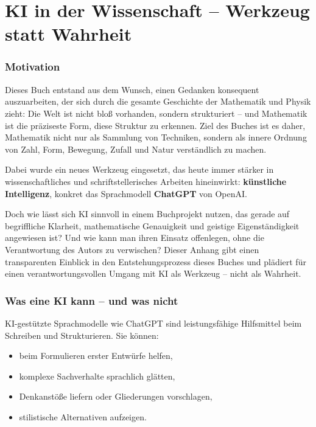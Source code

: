 \cleardoublepage

\chapter{KI in der Wissenschaft – Werkzeug statt Wahrheit}
\label{anhangC:ki}

\subsection*{Motivation}

Dieses Buch entstand aus dem Wunsch, einen Gedanken konsequent auszuarbeiten, der sich durch die gesamte Geschichte der Mathematik und Physik zieht: Die Welt ist nicht bloß vorhanden, sondern strukturiert -- und Mathematik ist die präziseste Form, diese Struktur zu erkennen. Ziel des Buches ist es daher, Mathematik nicht nur als Sammlung von Techniken, sondern als innere Ordnung von Zahl, Form, Bewegung, Zufall und Natur verständlich zu machen.

Dabei wurde ein neues Werkzeug eingesetzt, das heute immer stärker in wissenschaftliches und schriftstellerisches Arbeiten hineinwirkt: \textbf{künstliche Intelligenz}, konkret das Sprachmodell \textbf{ChatGPT} von OpenAI.

Doch wie lässt sich KI sinnvoll in einem Buchprojekt nutzen, das gerade auf begriffliche Klarheit, mathematische Genauigkeit und geistige Eigenständigkeit angewiesen ist? Und wie kann man ihren Einsatz offenlegen, ohne die Verantwortung des Autors zu verwischen? Dieser Anhang gibt einen transparenten Einblick in den Entstehungsprozess dieses Buches und plädiert für einen verantwortungsvollen Umgang mit KI als Werkzeug -- nicht als Wahrheit.

\subsection*{Was eine KI kann -- und was nicht}

KI-gestützte Sprachmodelle wie ChatGPT sind leistungsfähige Hilfsmittel beim Schreiben und Strukturieren. Sie können:

\begin{itemize}
	\item beim Formulieren erster Entwürfe helfen,
	\item komplexe Sachverhalte sprachlich glätten,
	\item Denkanstöße liefern oder Gliederungen vorschlagen,
	\item stilistische Alternativen aufzeigen.
\end{itemize}

